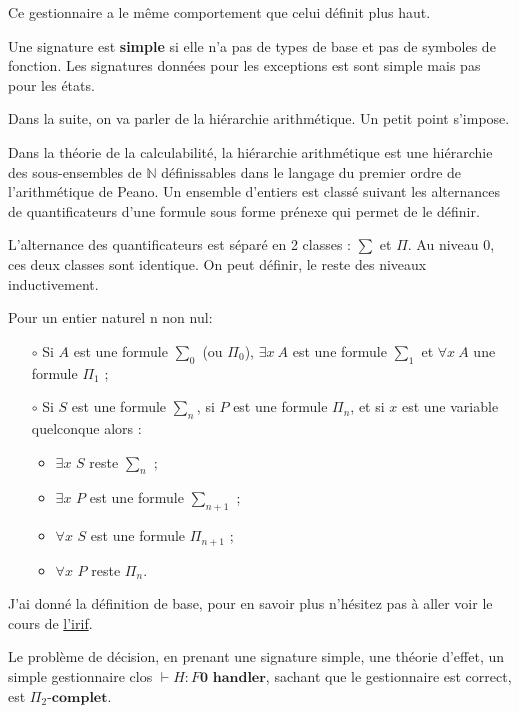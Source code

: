 	
Ce gestionnaire a le même comportement que celui définit plus haut.

\begin{remark}
	Une signature est \textbf{simple} si elle n'a pas de types de base et pas de symboles de fonction. Les signatures données pour les exceptions est sont simple mais pas pour les états.
\end{remark}

\begin{remark}
	Dans la suite, on va parler de la hiérarchie arithmétique. Un petit point s'impose.

	Dans la théorie de la calculabilité, la hiérarchie arithmétique est une hiérarchie des sous-ensembles de $\mathbb{N}$ 
	définissables dans le langage du premier ordre de l'arithmétique de Peano. Un ensemble d'entiers est classé suivant 
	les alternances de quantificateurs d'une formule sous forme prénexe qui permet de le définir. 


	L'alternance des quantificateurs est séparé en 2 classes : $\sum$ et $\Pi$. Au niveau 0, ces deux classes sont
	identique. On peut définir, le reste des niveaux inductivement.
	\medbreak

	Pour un entier naturel n non nul:
	\begin{enumerate}
		\item[$\circ$] Si $A$ est une formule $\sum_0$ (ou $\Pi_0$), $\exists x~A$ est une formule $\sum_1$ 
		et $\forall x~A$ une formule $\Pi_1$ ;
		\item[$\circ$] Si $S$ est une formule $\sum_n$, si $P$ est une formule $\Pi_n$, et si $x$ est une variable 
		quelconque alors :
		\begin{itemize}
			\item $\exists x$ $S$ reste $\sum_n$ ;
			\item $\exists x$ $P$ est une formule $\sum_{n+1}$ ;
			\item $\forall x$ $S$ est une formule $\Pi_{n+1}$ ;
			\item $\forall x$ $P$ reste $\Pi_n$.
		\end{itemize}
	\end{enumerate}

	
	J'ai donné la définition de base, pour en savoir plus n'hésitez pas à aller voir le cours de \href{https://www.irif.fr/~roziere//m2cf2/}{l'irif}.
    
\end{remark}

\begin{theorem}
	Le problème de décision, en prenant une signature simple, une théorie d'effet, un simple gestionnaire clos $\vdash H:F\textbf{0~handler}$, sachant que le gestionnaire est correct, est $\Pi_2$-$\textbf{complet}$.
\end{theorem}

